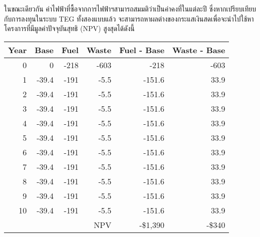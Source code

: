 \documentclass[11pt]{article}
\begin{document}
\mydata


ในขณะเดียวกัน ค่าไฟฟ้าที่ซื้อจากการไฟฟ้าฯสามารถสมมติว่าเป็นค่าคงที่ในแต่ละปี ซึ่งหากเปรียบเทียบกับการลงทุนในระบบ TEG ทั้งสองแบบแล้ว จะสามารถหาผลต่างของกระแสเงินสดเพื่อจะนำไปใช้หาโครงการที่มีมูลค่าปัจจุบันสุทธิ (NPV) สูงสุดได้ดังนี้

\begin{center}
\begin{tabular}{rrrrrr}
\hline
Year & Base & Fuel & Waste & Fuel - Base & Waste - Base\\
\hline
0 & 0 & -218 & -603 & -218 & -603\\
1 & -39.4 & -191 & -5.5 & -151.6 & 33.9\\
2 & -39.4 & -191 & -5.5 & -151.6 & 33.9\\
3 & -39.4 & -191 & -5.5 & -151.6 & 33.9\\
4 & -39.4 & -191 & -5.5 & -151.6 & 33.9\\
5 & -39.4 & -191 & -5.5 & -151.6 & 33.9\\
6 & -39.4 & -191 & -5.5 & -151.6 & 33.9\\
7 & -39.4 & -191 & -5.5 & -151.6 & 33.9\\
8 & -39.4 & -191 & -5.5 & -151.6 & 33.9\\
9 & -39.4 & -191 & -5.5 & -151.6 & 33.9\\
10 & -39.4 & -191 & -5.5 & -151.6 & 33.9\\
\hline
 &  &  & NPV & -\$1,390 & -\$340\\
\hline
\end{tabular}
\end{center}
\end{document}
